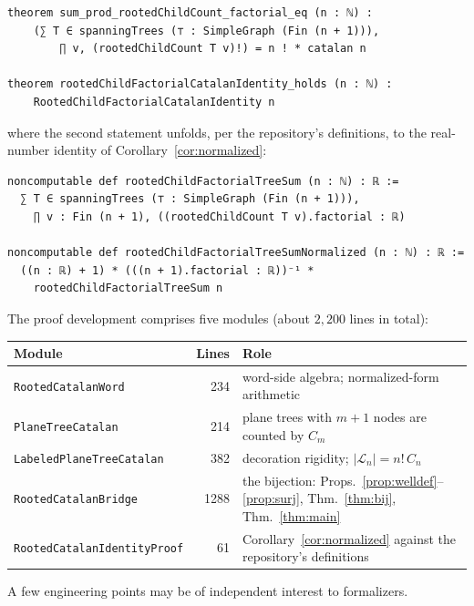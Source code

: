 \documentclass[11pt]{article}
\theoremstyle{remark}
\theoremstyle{definition}
\begin{document}
\begin{lstlisting}
theorem sum_prod_rootedChildCount_factorial_eq (n : ℕ) :
    (∑ T ∈ spanningTrees (⊤ : SimpleGraph (Fin (n + 1))),
        ∏ v, (rootedChildCount T v)!) = n ! * catalan n

theorem rootedChildFactorialCatalanIdentity_holds (n : ℕ) :
    RootedChildFactorialCatalanIdentity n
\end{lstlisting}

\noindent
where the second statement unfolds, per the repository's definitions, to the
real-number identity of Corollary~\ref{cor:normalized}:

\begin{lstlisting}
noncomputable def rootedChildFactorialTreeSum (n : ℕ) : ℝ :=
  ∑ T ∈ spanningTrees (⊤ : SimpleGraph (Fin (n + 1))),
    ∏ v : Fin (n + 1), ((rootedChildCount T v).factorial : ℝ)

noncomputable def rootedChildFactorialTreeSumNormalized (n : ℕ) : ℝ :=
  ((n : ℝ) + 1) * (((n + 1).factorial : ℝ))⁻¹ *
    rootedChildFactorialTreeSum n
\end{lstlisting}

The proof development comprises five modules
(about $2{,}200$ lines in total):

\begin{center}
\begin{tabular}{lrl}
\toprule
Module & Lines & Role \\
\midrule
\texttt{RootedCatalanWord} & 234 &
  word-side algebra; normalized-form arithmetic \\
\texttt{PlaneTreeCatalan} & 214 &
  plane trees with $m+1$ nodes are counted by $C_m$ \\
\texttt{LabeledPlaneTreeCatalan} & 382 &
  decoration rigidity; $|\mathcal{L}_n| = n!\,C_n$ \\
\texttt{RootedCatalanBridge} & 1288 &
  the bijection: Props.~\ref{prop:welldef}--\ref{prop:surj},
  Thm.~\ref{thm:bij}, Thm.~\ref{thm:main} \\
\texttt{RootedCatalanIdentityProof} & 61 &
  Corollary~\ref{cor:normalized} against the repository's definitions \\
\bottomrule
\end{tabular}
\end{center}

A few engineering points may be of independent interest to formalizers.
\end{document}
